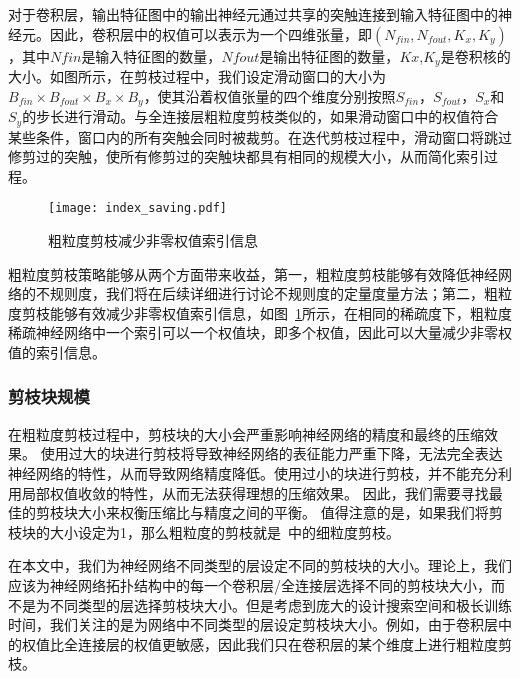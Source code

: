 对于卷积层，输出特征图中的输出神经元通过共享的突触连接到输入特征图中的神经元。因此，卷积层中的权值可以表示为一个四维张量，即$(N_{fin},N_{fout},K_x,K_y)$，其中$N {fin}$是输入特征图的数量，$N {fout}$是输出特征图的数量，$K x$,$K_y$是卷积核的大小。如图所示，在剪枝过程中，我们设定滑动窗口的大小为$B_{fin} \times B_{fout} \times B_x \times B_y$，使其沿着权值张量的四个维度分别按照$S_{fin}$，$S_{fout}$，$S_x$和$S_y$的步长进行滑动。与全连接层粗粒度剪枝类似的，如果滑动窗口中的权值符合某些条件，窗口内的所有突触会同时被裁剪。在迭代剪枝过程中，滑动窗口将跳过修剪过的突触，使所有修剪过的突触块都具有相同的规模大小，从而简化索引过程。

\begin{figure}[h]
  \centering
  \texttt{[image: index\_saving.pdf]}
  \caption{粗粒度剪枝减少非零权值索引信息}
  \label{fig:index_saving}
\end{figure}

粗粒度剪枝策略能够从两个方面带来收益，第一，粗粒度剪枝能够有效降低神经网络的不规则度，我们将在后续详细进行讨论不规则度的定量度量方法；第二，粗粒度剪枝能够有效减少非零权值索引信息，如图~\ref{fig:index_saving}所示，在相同的稀疏度下，粗粒度稀疏神经网络中一个索引可以一个权值块，即多个权值，因此可以大量减少非零权值的索引信息。


\subsubsection{剪枝块规模}

在粗粒度剪枝过程中，剪枝块的大小会严重影响神经网络的精度和最终的压缩效果。
使用过大的块进行剪枝将导致神经网络的表征能力严重下降，无法完全表达神经网络的特性，从而导致网络精度降低。使用过小的块进行剪枝，并不能充分利用局部权值收敛的特性，从而无法获得理想的压缩效果。
因此，我们需要寻找最佳的剪枝块大小来权衡压缩比与精度之间的平衡。
值得注意的是，如果我们将剪枝块的大小设定为1，那么粗粒度的剪枝就是~\cite{han2015learning}中的细粒度剪枝。

在本文中，我们为神经网络不同类型的层设定不同的剪枝块的大小。理论上，我们应该为神经网络拓扑结构中的每一个卷积层/全连接层选择不同的剪枝块大小，而不是为不同类型的层选择剪枝块大小。但是考虑到庞大的设计搜索空间和极长训练时间，我们关注的是为网络中不同类型的层设定剪枝块大小。例如，由于卷积层中的权值比全连接层的权值更敏感，因此我们只在卷积层的某个维度上进行粗粒度剪枝。

